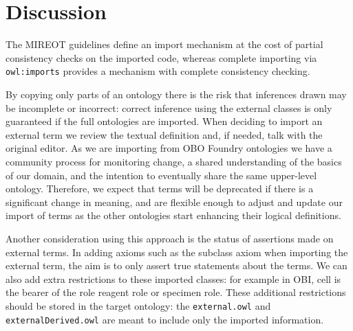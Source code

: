 \documentclass[a4paper,10pt,twocolumn]{article}
\newcommand{\protege}{Prot\'{e}g\'{e}}
\begin{document}
\section*{Discussion}

The MIREOT guidelines define an import mechanism at the cost of partial consistency checks on the imported code, whereas complete importing via \texttt{owl:imports} provides a mechanism with complete consistency checking.


By copying only parts of an ontology there is the risk that inferences drawn may be incomplete or incorrect: correct inference using the external classes is only guaranteed if the full ontologies are imported.
When deciding to import an external term we review the textual definition and, if needed, talk with the original editor.
As we are importing from OBO Foundry ontologies we have a community process for monitoring change, a shared understanding of the basics of our domain, and the intention to eventually share the same upper-level ontology. 
Therefore, we expect that terms will be deprecated if there is a significant change in meaning, and are flexible enough to adjust and update our import of terms as the other ontologies start enhancing their logical definitions.


Another consideration using this approach is the status of assertions made on external terms.
In adding axioms such as the subclass axiom when importing the external term, the aim is to only assert true statements about the terms.
We can also add extra restrictions to these imported classes: for example in OBI, cell is the bearer of the role reagent role or specimen role. 
These additional restrictions should be stored in the target ontology: the \texttt{external.owl} and \texttt{externalDerived.owl} are meant to include only the imported information.
\end{document}
